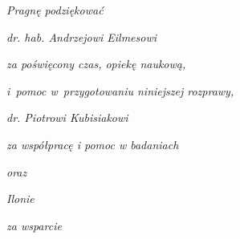 \afterpage{\blankpage}
\cleardoublepage
\thispagestyle{empty}

\vspace*{\fill}
\onehalfspacing
\begin{flushright}

    \textit{Pragnę podziękować}

    \textit{dr. hab. Andrzejowi Eilmesowi}

    \textit{za poświęcony czas, opiekę naukową,}

    \textit{i~pomoc w~przygotowaniu niniejszej rozprawy,}

    \textit{dr. Piotrowi Kubisiakowi}

    \textit{za współpracę i pomoc w badaniach}

    \textit{oraz}

    \textit{Ilonie}

    \textit{za wsparcie}

\end{flushright}
\vspace*{\fill}

\afterpage{\blankpage}